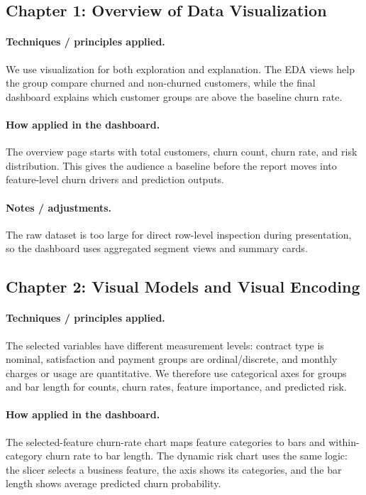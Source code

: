 \subsection{Chapter 1: Overview of Data Visualization}
\paragraph{Techniques / principles applied.}
We use visualization for both exploration and explanation. The EDA views help
the group compare churned and non-churned customers, while the final dashboard
explains which customer groups are above the baseline churn rate.

\paragraph{How applied in the dashboard.}
The overview page starts with total customers, churn count, churn rate, and risk
distribution. This gives the audience a baseline before the report moves into
feature-level churn drivers and prediction outputs.

\paragraph{Notes / adjustments.}
The raw dataset is too large for direct row-level inspection during
presentation, so the dashboard uses aggregated segment views and summary cards.

\subsection{Chapter 2: Visual Models and Visual Encoding}
\paragraph{Techniques / principles applied.}
The selected variables have different measurement levels: contract type is
nominal, satisfaction and payment groups are ordinal/discrete, and monthly
charges or usage are quantitative. We therefore use categorical axes for groups
and bar length for counts, churn rates, feature importance, and predicted risk.

\paragraph{How applied in the dashboard.}
The selected-feature churn-rate chart maps feature categories to bars and
within-category churn rate to bar length. The dynamic risk chart uses the same
logic: the slicer selects a business feature, the axis shows its categories, and
the bar length shows average predicted churn probability.


